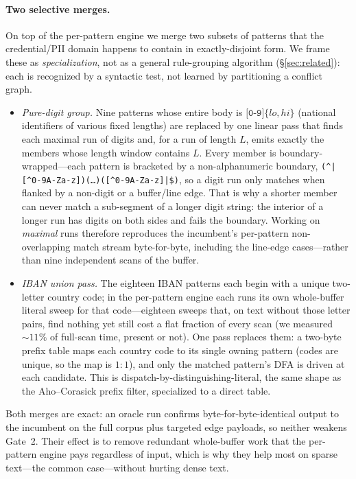 \documentclass[acmsmall,nonacm,screen]{acmart}
\begin{document}
\paragraph{Two selective merges.} On top of the per-pattern engine we merge two
subsets of patterns that the credential/PII domain happens to contain in
exactly-disjoint form. We frame these as \emph{specialization}, not as a general
rule-grouping algorithm (\S\ref{sec:related}): each is recognized by a syntactic
test, not learned by partitioning a conflict graph.
\begin{itemize}
  \item \emph{Pure-digit group.} Nine patterns whose entire body is
  \(\texttt{[0-9]}\{lo,hi\}\) (national identifiers of various fixed lengths) are
  replaced by one linear pass that finds each maximal run of digits and, for a run
  of length \(L\), emits exactly the members whose length window contains \(L\).
  Every member is boundary-wrapped---each pattern is bracketed by a non-alphanumeric
  boundary, \texttt{(\^{}|[\^{}0-9A-Za-z])(\ldots)([\^{}0-9A-Za-z]|\$)}, so a digit
  run only matches when flanked by a non-digit or a buffer/line edge.
  That is why a shorter member can never match a sub-segment of a longer digit
  string: the interior of a longer run has digits on both sides and fails the
  boundary. Working on \emph{maximal} runs therefore reproduces the incumbent's
  per-pattern non-overlapping match stream byte-for-byte, including the line-edge
  cases---rather than nine independent scans of the buffer.
  \item \emph{IBAN union pass.} The eighteen IBAN patterns each begin with a unique
  two-letter country code; in the per-pattern engine each runs its own
  whole-buffer literal sweep for that code---eighteen sweeps that, on text without
  those letter pairs, find nothing yet still cost a flat fraction of every scan (we
  measured \(\sim 11\%\) of full-scan time, present or not). One pass replaces them:
  a two-byte prefix table maps each country code to its single owning pattern
  (codes are unique, so the map is \(1\!:\!1\)), and only the matched pattern's DFA
  is driven at each candidate. This is dispatch-by-distinguishing-literal, the same
  shape as the Aho--Corasick prefix filter, specialized to a direct table.
\end{itemize}
Both merges are exact: an oracle run confirms byte-for-byte-identical output to the
incumbent on the full corpus plus targeted edge payloads, so neither weakens
Gate~2. Their effect is to remove redundant whole-buffer work that the per-pattern
engine pays regardless of input, which is why they help most on sparse text---the
common case---without hurting dense text.
\end{document}
